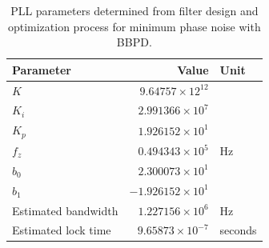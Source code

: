 		\begin{table}[h!]
			\centering
			\def\arraystretch{1.5}		
			\setlength\arrayrulewidth{0.75pt}
			\setlength{\tabcolsep}{1em} %
			\begin{tabular}{|l|r|l|}
				\hline 
				\rule[-1ex]{0pt}{2.5ex} \cellcolor{gray!40}\textbf{Parameter} & \cellcolor{gray!40}\textbf{Value} & \cellcolor{gray!40}\textbf{Unit }\\ 
				\hline 
				\rule[-1ex]{0pt}{2.5ex} \textbf{$K$}  & $9.64757\times12^{12}$ &  \\
				\hline 
				\rule[-1ex]{0pt}{2.5ex} \textbf{$K_i$}  & $2.991366\times10^{7}$ &  \\
				\hline 
				\rule[-1ex]{0pt}{2.5ex} \textbf{$K_p$}  & $1.926152\times10^{1}$ &  \\
				\hline 
				\rule[-1ex]{0pt}{2.5ex} \textbf{$f_z$} & $0.494343\times10^5$ & Hz\\
				\hline 
				\rule[-1ex]{0pt}{2.5ex} \textbf{$b_0$}  & $2.300073\times10^1$  &\\
				\hline 
				\rule[-1ex]{0pt}{2.5ex} \textbf{$b_1$}  & $-1.926152\times10^1$  & \\
				\hline 
				\rule[-1ex]{0pt}{2.5ex} Estimated bandwidth & $1.227156\times10^6$ & Hz \\
				\hline 
				\rule[-1ex]{0pt}{2.5ex} Estimated lock time & $9.65873\times10^{-7}$ & seconds \\
				\hline 
			\end{tabular} 
			\caption{PLL parameters determined from filter design and optimization process for minimum phase noise with BBPD.}
			\label{filter_params_bbpd_low_noise}
		\end{table}   
